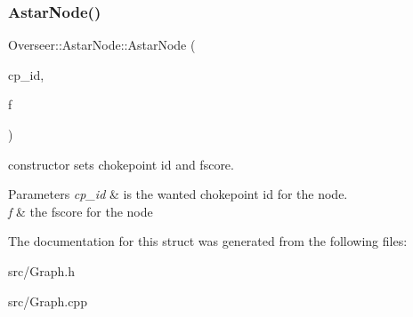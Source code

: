 \subsubsection{\texorpdfstring{Astar\+Node()}{AstarNode()}}
{\footnotesize\ttfamily Overseer\+::\+Astar\+Node\+::\+Astar\+Node (\begin{DoxyParamCaption}\item[{Choke\+Point\+Id}]{cp\+\_\+id,  }\item[{float}]{f }\end{DoxyParamCaption})}



constructor sets chokepoint id and fscore. 


\begin{DoxyParams}{Parameters}
{\em cp\+\_\+id} & is the wanted chokepoint id for the node. \\
\hline
{\em f} & the fscore for the node \\
\hline
\end{DoxyParams}


The documentation for this struct was generated from the following files\+:\begin{DoxyCompactItemize}
\item 
src/Graph.\+h\item 
src/Graph.\+cpp\end{DoxyCompactItemize}
